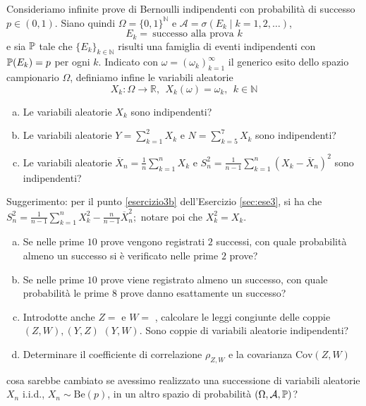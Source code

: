 Consideriamo infinite prove di Bernoulli indipendenti con probabilità di successo $p\in (0,1)$. Siano quindi $\Omega =\{0,1\}^{\mathbb{N}}$ e $\mathcal{A} =\sigma (E_{k} \mid k=1,2,\dots)$,
\begin{equation*}
E_{k} =\ \text{successo alla prova } k
\end{equation*}
e sia $\mathbb{P}$ tale che $\{E_{k}\}_{k\in \mathbb{N}}$ risulti una famiglia di eventi indipendenti con $\mathbb{P}(E_{k}) =p$ per ogni $k$. Indicato con $\omega =(\omega_{k})_{k=1}^{\infty }$ il generico esito dello spazio campionario $\Omega $, definiamo infine le variabili aleatorie
\begin{equation*}
X_{k} :\Omega \rightarrow \mathbb{R} ,\ \ X_{k} (\omega)=\omega_{k} ,\ \ k\in \mathbb{N}
\end{equation*}
\begin{enumerate}[a)]
	\item Le variabili aleatorie $X_{k}$ sono indipendenti?
	\item Le variabili aleatorie $Y=\sum_{k=1}^{2} X_{k}$ e $N=\sum_{k=5}^{7} X_{k}$ sono indipendenti?
	\item Le variabili aleatorie $\overline{X}_{n} =\frac{1}{n}\sum_{k=1}^{n} X_{k}$ e $S_{n}^{2} =\frac{1}{n-1}\sum_{k=1}^{n}(X_{k} -\overline{X}_{n})^{2}$ sono indipendenti?
\end{enumerate}
Suggerimento: per il punto \ref{esercizio3b} dell'Esercizio \ref{sec:ese3}, si ha che $S_{n}^{2} =\frac{1}{n-1}\sum_{k=1}^{n} X_{k}^{2} -\frac{n}{n-1}\overline{X}_{n}^{2} ;$ notare poi che $X_{k}^{2} =X_{k}$.
\begin{enumerate}[a),resume]
	\item Se nelle prime $10$ prove vengono registrati $2$ successi, con quale probabilità almeno un successo si è verificato nelle prime $2$ prove?
	\item Se nelle prime $10$ prove viene registrato almeno un successo, con quale probabilità le prime $8$ prove danno esattamente un successo?
	\item Introdotte anche $Z=$  e $W=$ , calcolare le leggi congiunte delle coppie $(Z,W),(Y,Z)$ $(Y,W).$ Sono coppie di variabili aleatorie indipendenti?
	\item Determinare il coefficiente di correlazione $\rho_{Z,W}$ e la covarianza $\mathrm{Cov} (Z,W)$
\end{enumerate}
cosa sarebbe cambiato se avessimo realizzato una successione di variabili aleatorie $X_{n}$ i.i.d., $X_{n} \sim \mathrm{Be} (p)$, in un altro spazio di probabilità $(\Omega ,\mathcal{A} ,\mathbb{P})$?

